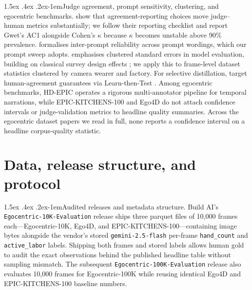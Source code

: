 \documentclass[11pt]{article}
\makeatletter
\renewcommand\paragraph{\@startsection{paragraph}{4}{\z@}%
  {1.5ex \@plus .4ex \@minus .2ex}{-1em}{\normalfont\normalsize\bfseries}}
\makeatother
\begin{document}
\paragraph{Judge agreement, prompt sensitivity, clustering, and egocentric benchmarks.}
\citet{rao2026agreement} show that agreement-reporting choices move judge--human metrics
substantially; we follow their reporting checklist and report Gwet's AC1 \citep{gwet2008ac1}
alongside Cohen's $\kappa$ because $\kappa$ becomes unstable above 90\% prevalence.
\citet{liu2026ipr} formalises inter-prompt reliability across prompt wordings, which our prompt
sweep adopts. \citet{miller2024errorbars} emphasises clustered standard errors in model
evaluation, building on classical survey design effects \citep{kish1965survey}; we apply this
to frame-level dataset statistics clustered by camera wearer and factory. For selective
distillation, \citet{jung2024trustorescalate} target human-agreement guarantees via Learn-then-Test
\citep{angelopoulos2021ltt}. Among egocentric benchmarks, HD-EPIC \citep{perrett2025hdepic}
operates a rigorous multi-annotator pipeline for temporal narrations, while EPIC-KITCHENS-100
\citep{damen2022epic100} and Ego4D \citep{grauman2022ego4d} do not attach confidence intervals or
judge-validation metrics to headline quality summaries. Across the egocentric dataset papers we
read in full, none reports a confidence interval on a headline corpus-quality statistic.

\section{Data, release structure, and protocol}
\label{sec:protocol}

\paragraph{Audited releases and metadata structure.}
Build AI's \texttt{Egocentric-10K-Evaluation} release ships three parquet files of 10{,}000 frames
each---Egocentric-10K, Ego4D, and EPIC-KITCHENS-100---containing image bytes alongside the
vendor's stored \texttt{gemini-2.5-flash} per-frame \texttt{hand\_count} and
\texttt{active\_labor} labels. Shipping both frames and stored labels allows human gold to audit
the exact observations behind the published headline table without sampling mismatch. The
subsequent \texttt{Egocentric-100K-Evaluation} release also evaluates 10{,}000 frames for
Egocentric-100K while reusing identical Ego4D and EPIC-KITCHENS-100 baseline numbers.
\end{document}
